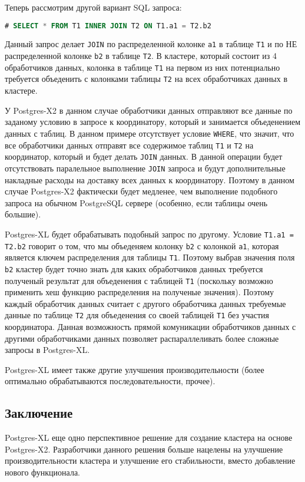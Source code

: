 Теперь рассмотрим другой вариант SQL запроса:

\begin{lstlisting}[language=SQL,label=lst:postgres-xl1,caption=Запрос на распределенные таблицы]
# SELECT * FROM T1 INNER JOIN T2 ON T1.a1 = T2.b2
\end{lstlisting}

Данный запрос делает \lstinline!JOIN! по распределенной колонке \lstinline!a1! в таблице \lstinline!T1! и по НЕ распределенной колонке \lstinline!b2! в таблице \lstinline!T2!. В кластере, который состоит из 4 обработчиков данных, колонка в таблице \lstinline!T1! на первом из них потенциально требуется объеденить с колонками таблицы \lstinline!T2! на всех обработчиках данных в кластере.

У Postgres-X2 в данном случае обработчики данных отправляют все данные по заданому условию в запросе к координатору, который и занимается объеденением данных с таблиц. В данном примере отсутствует условие \lstinline!WHERE!, что значит, что все обработчики данных отправят все содержимое таблиц \lstinline!T1! и \lstinline!T2! на координатор, который и будет делать \lstinline!JOIN! данных. В данной операции будет отсутствовать паралельное выполнение \lstinline!JOIN! запроса и будут дополнительные накладные расходы на доставку всех данных к координатору. Поэтому в данном случае Postgres-X2 фактически будет медленее, чем выполнение подобного запроса на обычном PostgreSQL сервере (особенно, если таблицы очень большие).

Postgres-XL будет обрабатывать подобный запрос по другому. Условие \lstinline!T1.a1 = T2.b2! говорит о том, что мы объеденяем колонку \lstinline!b2! с колонкой \lstinline!a1!, которая является ключем распределения для таблицы \lstinline!T1!. Поэтому выбрав значения поля \lstinline!b2! кластер будет точно знать для каких обработчиков данных требуется полученый результат для объеденения с таблицей \lstinline!T1! (поскольку возможно применить хеш функцию распределения на полученые значения). Поэтому каждый обработчик данных считает с другого обработчика данных требуемые данные по таблице \lstinline!T2! для объеденения со своей таблицей \lstinline!T1! без участия координатора. Данная возможность прямой комуникации обработчиков данных с другими обработчиками данных позволяет распараллеливать более сложные запросы в Postgres-XL.

Postgres-XL имеет также другие улучшения производительности (более оптимально обрабатываются последовательности, прочее).


\subsection{Заключение}

Postgres-XL еще одно перспективное решение для создание кластера на основе Postgres-X2. Разработчики данного решения больше нацелены на улучшение производительности кластера и улучшение его стабильности, вместо добавление нового функционала.

